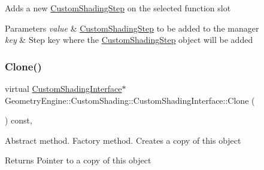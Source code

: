Adds a new \mbox{\hyperlink{class_geometry_engine_1_1_custom_shading_1_1_custom_shading_step}{Custom\+Shading\+Step}} on the selected function slot 
\begin{DoxyParams}{Parameters}
{\em value} & \mbox{\hyperlink{class_geometry_engine_1_1_custom_shading_1_1_custom_shading_step}{Custom\+Shading\+Step}} to be added to the manager \\
\hline
{\em key} & Step key where the \mbox{\hyperlink{class_geometry_engine_1_1_custom_shading_1_1_custom_shading_step}{Custom\+Shading\+Step}} object will be added \\
\hline
\end{DoxyParams}
\mbox{\label{class_geometry_engine_1_1_custom_shading_1_1_custom_shading_interface_a5fadd669b771d5782f3aed2303862bbe}} 
\subsubsection{\texorpdfstring{Clone()}{Clone()}}
{\footnotesize\ttfamily virtual \mbox{\hyperlink{class_geometry_engine_1_1_custom_shading_1_1_custom_shading_interface}{Custom\+Shading\+Interface}}$\ast$ Geometry\+Engine\+::\+Custom\+Shading\+::\+Custom\+Shading\+Interface\+::\+Clone (\begin{DoxyParamCaption}{ }\end{DoxyParamCaption}) const\hspace{0.3cm}{\ttfamily [inline]}, {\ttfamily [virtual]}}

Abstract method. Factory method. Creates a copy of this object \begin{DoxyReturn}{Returns}
Pointer to a copy of this object 
\end{DoxyReturn}
\mbox{\label{class_geometry_engine_1_1_custom_shading_1_1_custom_shading_interface_a3702af941a05a692b3e9c8f9597a0f76}} 
